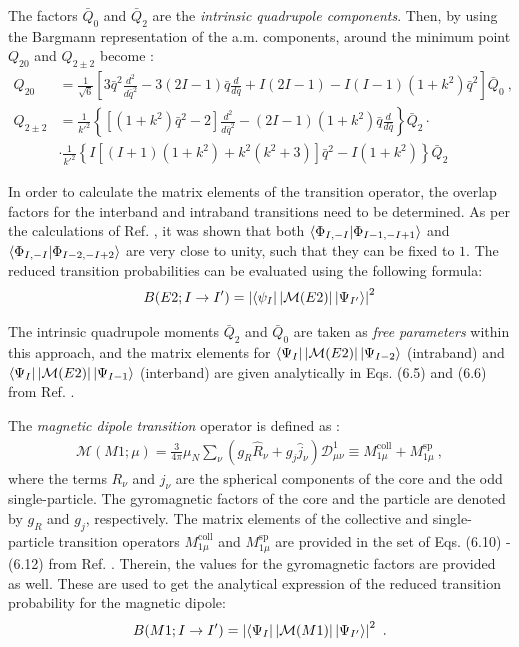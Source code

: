 The factors $\bar{Q}_0$ and $\bar{Q}_2$ are the \emph{intrinsic quadrupole components}. Then, by using the Bargmann representation of the a.m. components, around the minimum point $Q_{20}$ and $Q_{2\pm2}$ become \cite{raduta2020new}:
\begin{align}
    Q_{20}&=\frac{1}{\sqrt{6}}\left[3\bar{q}^2\frac{d^2}{d\bar{q}^2}-3(2I-1)\bar{q}\frac{d}{d\bar{q}}+I(2I-1)-I(I-1)(1+k^2)\bar{q}^2\right]\bar{Q}_0\ ,\nonumber\\
    Q_{2\pm2}&=\frac{1}{k'^2}\left\{\left[(1+k^2)\bar{q}^2-2\right]\frac{d^2}{d\bar{q}^2}-(2I-1)(1+k^2)\bar{q}\frac{d}{d\bar{q}}\right\}\bar{Q}_2\cdot \nonumber\\
    &\cdot\frac{1}{k'^2}\left\{I\left[(I+1)(1+k^2)+k^2(k^2+3)\right]\bar{q}^2-I(1+k^2)\right\}\bar{Q}_2
\end{align}

In order to calculate the matrix elements of the transition operator, the overlap factors for the interband and intraband transitions need to be determined. As per the calculations of Ref. \cite{raduta2020new}, it was shown that both $\bra{\Phi_{I,-I}}\ket{\Phi_{I-1,-I+1}}$ and $\bra{\Phi_{I,-I}}\ket{\Phi_{I-2,-I+2}}$ are very close to unity, such that they can be fixed to $1$. The reduced transition probabilities can be evaluated using the following formula:
\begin{align}
    B(E2;I\to I')=\left|\bra{\psi_I}|\mathcal{M}(E2)|\ket{\Psi_{I'}}\right|^2
    \label{reduced-electric-quadrupole-new-boson}
\end{align}

The intrinsic quadrupole moments $\bar{Q}_2$ and $\bar{Q}_0$ are taken as \emph{free parameters} within this approach, and the matrix elements for $\bra{\Psi_I}|\mathcal{M}(E2)|\ket{\Psi_{I-2}}$ (intraband) and $\bra{\Psi_I}|\mathcal{M}(E2)|\ket{\Psi_{I-1}}$ (interband) are given analytically in Eqs. (6.5) and (6.6) from Ref. \cite{raduta2020new}.

The \emph{magnetic dipole transition} operator is defined as \cite{raduta2020new}:
\begin{align}
    \mathcal{M}\left(M1;\mu\right)=\frac{3}{4\pi}\mu_N\sum_{\nu}\left(g_R\hat{R}_\nu+g_j\hat{j}_\nu\right)\mathcal{D}_{\mu\nu}^1\equiv M_{1\mu}^\text{coll}+M_{1\mu}^\text{sp}\ ,
\end{align}
where the terms $R_\nu$ and $j_\nu$ are the spherical components of the core and the odd single-particle. The gyromagnetic factors of the core and the particle are denoted by $g_R$ and $g_j$, respectively. The matrix elements of the collective and single-particle transition operators $M_{1\mu}^\text{coll}$ and $M_{1\mu}^\text{sp}$ are provided in the set of Eqs. (6.10) - (6.12) from Ref. \cite{raduta2020new}. Therein, the values for the gyromagnetic factors are provided as well. These are used to get the analytical expression of the reduced transition probability for the magnetic dipole:
\begin{align}
    B(M1;I\to I')=\left|\bra{\Psi_{I}}|\mathcal{M}(M1)|\ket{\Psi_{I'}}\right|^2\ .
    \label{reduced-magnetic-dipole-new-boson}
\end{align}

